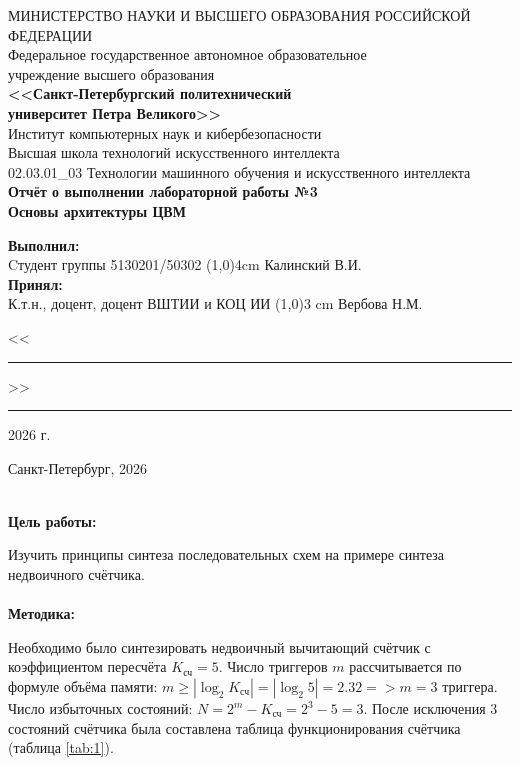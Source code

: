 \documentclass[14pt, a4paper]{extarticle}
\begin{document}
\thispagestyle{empty}
\begin{center}
    \hspace{0.2cm}МИНИСТЕРСТВО НАУКИ И ВЫСШЕГО ОБРАЗОВАНИЯ РОССИЙСКОЙ ФЕДЕРАЦИИ\\
    Федеральное государственное автономное образовательное\\
    учреждение высшего образования\\
    {\bf <<Санкт-Петербургский политехнический\\
    университет Петра Великого>>}\\
    Институт компьютерных наук и кибербезопасности\\
    Высшая школа технологий искусственного интеллекта\\
    02.03.01\_03 Технологии машинного обучения и искусственного интеллекта\\
    \vspace{3cm}
    \Large\bf{
        Отчёт о выполнении лабораторной работы №3\\
        Основы архитектуры ЦВМ\\[1cm]
    }
\end{center}
\vspace{2cm}
\begin{flushleft}
    {\bf Выполнил:}\\
    Cтудент группы 5130201/50302 \hfill
    \line(1,0){4cm} \quad Калинский В.И.\\
    {\bf Принял:}\\
    К.т.н., доцент, доцент ВШТИИ и КОЦ ИИ \hfill
    \line(1,0){3 cm} \quad Вербова Н.М.\\[0.5cm]
    { \hfill<<\rule{1cm}{0.5pt}>>\rule{2cm}{0.5pt}\hspace{3pt}2026 г.}
\end{flushleft}
\vspace{1cm}
\begin{center}
    Санкт-Петербург, 2026
\end{center}
\newpage
\textbf{
	\\Цель работы:}

\noindent Изучить принципы синтеза последовательных схем на примере синтеза недвоичного счётчика.
\\\\
\textbf{Методика: }

Необходимо было синтезировать недвоичный вычитающий счётчик с коэффициентом пересчёта $K_\text{сч} = 5$. Число триггеров $m$ рассчитывается по формуле объёма памяти:
$m \ge |\log_2 K_\text{сч}| = |\log_2 5| = 2.32 => m = 3\text{ триггера}$. Число избыточных состояний: $N = 2^m - K_{\text{сч}} = 2^3 - 5 = 3$. После исключения 3 состояний счётчика была составлена таблица функционирования счётчика (таблица \ref{tab:1}).
\end{document}
